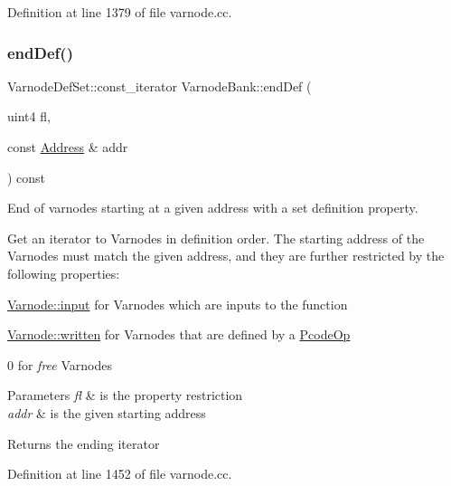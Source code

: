 Definition at line 1379 of file varnode.\+cc.

\mbox{\label{class_varnode_bank_a5b7c4e02a9a82a7a98e6555383f1ccb3}} 
\subsubsection{\texorpdfstring{endDef()}{endDef()}\hspace{0.1cm}{\footnotesize\ttfamily [3/3]}}
{\footnotesize\ttfamily Varnode\+Def\+Set\+::const\+\_\+iterator Varnode\+Bank\+::end\+Def (\begin{DoxyParamCaption}\item[{uint4}]{fl,  }\item[{const \mbox{\hyperlink{class_address}{Address}} \&}]{addr }\end{DoxyParamCaption}) const}



End of varnodes starting at a given address with a set definition property. 

Get an iterator to Varnodes in definition order. The starting address of the Varnodes must match the given address, and they are further restricted by the following properties\+:
\begin{DoxyItemize}
\item \mbox{\hyperlink{class_varnode_ad367c0ac3c08b6f41e7334e90a138e8ca9c9363556459d8828a5ab58c370ccd2e}{Varnode\+::input}} for Varnodes which are inputs to the function
\item \mbox{\hyperlink{class_varnode_ad367c0ac3c08b6f41e7334e90a138e8ca16c6748ecb7542c2f79d81be83098dd5}{Varnode\+::written}} for Varnodes that are defined by a \mbox{\hyperlink{class_pcode_op}{Pcode\+Op}}
\item 0 for {\itshape free} Varnodes 
\begin{DoxyParams}{Parameters}
{\em fl} & is the property restriction \\
\hline
{\em addr} & is the given starting address \\
\hline
\end{DoxyParams}
\begin{DoxyReturn}{Returns}
the ending iterator 
\end{DoxyReturn}

\end{DoxyItemize}

Definition at line 1452 of file varnode.\+cc.

